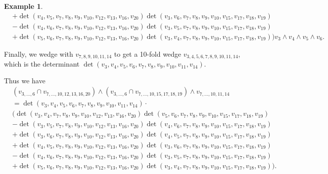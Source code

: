 \documentclass[10pt]{amsart}
\theoremstyle{definition}
\theoremstyle{plain}
\theoremstyle{plain}
\theoremstyle{definition}
\newtheorem{example}[cdrthm]{Example}
\theoremstyle{remark}
\theoremstyle{plain}
\theoremstyle{plain}
\theoremstyle{plain}
\numberwithin{equation}{section}
\begin{document}
\begin{example}
{\begin{align*}
     &+ \det\left(v_{4},v_{5},v_{7}, v_{8}, v_{9}, v_{10}, v_{12}, v_{13}, v_{16}, v_{20}\right) \det\left(v_{3},v_{6},v_7,v_8,v_9,v_{10},v_{15}, v_{17}, v_{18}, v_{19}\right) \nonumber \\
     &- \det\left(v_{4},v_{6},v_{7}, v_{8}, v_{9}, v_{10}, v_{12}, v_{13}, v_{16}, v_{20}\right) \det\left(v_{3},v_{5},v_7,v_8,v_9,v_{10},v_{15}, v_{17}, v_{18}, v_{19}\right) \nonumber \\
     &+ \det\left(v_{5},v_{6},v_{7}, v_{8}, v_{9}, v_{10}, v_{12}, v_{13}, v_{16}, v_{20}\right) \det\left(v_{3},v_{4},v_7,v_8,v_9,v_{10},v_{15}, v_{17}, v_{18}, v_{19}\right) \Bigg)v_{3} \wedge v_{4} \wedge v_{5} \wedge v_{6}. \nonumber
\end{align*}
}

Finally, we wedge with $v_{7,8,9,10,11,14}$ to get  a 10-fold wedge $v_{3,4,5,6,7,8,9,10,11,14}$, which is the determinant $\det\left(v_3,v_4,v_5, v_6, v_7, v_8, v_9, v_{10}, v_{11}, v_{14}\right).$


Thus we have 
{\small
\begin{align}
&(v_{3,\dots,6}  \cap v_{7,\dots,10,12,13,16,20} ) \wedge 
\left(v_{3,\dots,6} \cap v_{7,\dots,10,15,17,18,19} \right) \wedge v_{7,\dots,10,11,14} \nonumber \\
 &= \det\left(v_3,v_4,v_5, v_6, v_7, v_8, v_9, v_{10},v_{11}, v_{14}\right) \cdot \nonumber \\
&\Bigg( \det\left(v_{3},v_{4}, v_{7}, v_{8}, v_{9}, v_{10}, v_{12}, v_{13}, v_{16}, v_{20}\right)  \det\left(v_{5},v_{6},v_7,v_8,v_9,v_{10},v_{15}, v_{17}, v_{18}, v_{19}\right) \nonumber \\
     &- \det\left(v_{3},v_{5},v_{7}, v_{8}, v_{9}, v_{10}, v_{12}, v_{13}, v_{16}, v_{20}\right) \det\left(v_{4},v_{6},v_7,v_8,v_9,v_{10},v_{15}, v_{17}, v_{18}, v_{19}\right) \nonumber \\
     &+ \det\left(v_{3},v_{6},v_{7}, v_{8}, v_{9}, v_{10}, v_{12}, v_{13}, v_{16}, v_{20}\right) \det\left(v_{4},v_{5},v_7,v_8,v_9,v_{10},v_{15}, v_{17}, v_{18}, v_{19}\right) \nonumber \\
     &+ \det\left(v_{4},v_{5},v_{7}, v_{8}, v_{9}, v_{10}, v_{12}, v_{13}, v_{16}, v_{20}\right) \det\left(v_{3},v_{6},v_7,v_8,v_9,v_{10},v_{15}, v_{17}, v_{18}, v_{19}\right) \nonumber \\
     &- \det\left(v_{4},v_{6},v_{7}, v_{8}, v_{9}, v_{10}, v_{12}, v_{13}, v_{16}, v_{20}\right) \det\left(v_{3},v_{5},v_7,v_8,v_9,v_{10},v_{15}, v_{17}, v_{18}, v_{19}\right) \nonumber \\
     &+ \det\left(v_{5},v_{6},v_{7}, v_{8}, v_{9}, v_{10}, v_{12}, v_{13}, v_{16}, v_{20}\right) \det\left(v_{3},v_{4},v_7,v_8,v_9,v_{10},v_{15}, v_{17}, v_{18}, v_{19}\right)\Bigg). \nonumber
\end{align}
}



\end{example}
\end{document}
